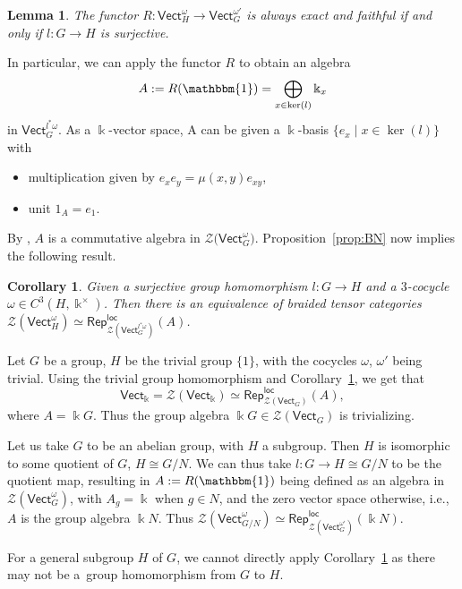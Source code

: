 \documentclass[pdftex]{sigma}
\numberwithin{equation}{section}
\newtheorem{Corollary}[Theorem]{Corollary}
\newtheorem{Lemma}[Theorem]{Lemma}
\newcommand{\locmod}{\mathsf{Rep}^{\mathsf{loc}}}
\newcommand{\Vect}{\mathsf{Vect}}
\newcommand{\cZ}{\mathcal{Z}}
\begin{document}
\begin{Lemma}%
The functor $R\colon \Vect_H^{\omega} \to \Vect_G^{\omega'}$ is always exact and faithful if and only if $l\colon G\to H$ is surjective.
\end{Lemma}


In particular, we can apply the functor $R$ to obtain an algebra
\[A:= R(\mathbbm{1}) = \bigoplus\limits_{x \in \ker(l)}\Bbbk_x \] in $\Vect_G^{l^*\omega}$.
As a $\Bbbk$-vector space, A can be given a $\Bbbk$-basis $\{e_x \mid x \in \ker (l)\}$ with
\begin{itemize}\itemsep=0pt
 \item multiplication given by $e_xe_y = \mu(x,y) e_{xy}$,
 \item unit $1_A = e_1$.
\end{itemize}
By \cite[Proposition 6.1]{BN11}, $A$ is a commutative algebra in $\cZ\big(\Vect_G^\omega\big)$.
Proposition~\ref{prop:BN} now implies the following result.

\begin{Corollary}\label{cor:gen-equiv}
Given a surjective group homomorphism $l\colon G\!\to\! H$ and a $3$-cocycle ${\omega\in C^3(H,\Bbbk^\times)}$.
Then there is an equivalence of braided tensor categories $\cZ(\Vect_H^{\omega})\simeq \locmod_{\cZ(\Vect_G^{l^*\omega})}(A)$.
\end{Corollary}

\begin{Example}
Let $G$ be a group, $H$ be the trivial group $\{1\}$, with the cocycles $\omega$, $\omega'$ being trivial. Using the trivial group homomorphism and Corollary~\ref{cor:gen-equiv}, we get that
\[\Vect_\Bbbk=\cZ(\Vect_\Bbbk) \simeq \locmod_{\cZ(\Vect_G)}(A),\]
where $A = \Bbbk G$. Thus the group algebra $\Bbbk G \in \cZ(\Vect_G)$ is trivializing.
\end{Example}

\begin{Example}
Let us take $G$ to be an abelian group, with $H$ a subgroup. Then $H$ is isomorphic to some quotient of $G$, $H \cong G/N$. We can thus take $l \colon G \to H \cong G/N$ to be the quotient map, resulting in $A:= R(\mathbbm{1})$ being defined as an algebra in $\cZ(\Vect_G^{\omega})$, with $A_g =\Bbbk$ when $g \in N$, and the zero vector space otherwise, i.e., $A$ is the group algebra $\Bbbk N$. Thus ${\cZ(\Vect^\omega_{G/N}) \simeq \locmod_{\cZ(\Vect_G^{\omega'})}(\Bbbk N)}$.
\end{Example}


For a general subgroup $H$ of $G$, we cannot directly apply Corollary~\ref{cor:gen-equiv} as there may not be a~group homomorphism from $G$ to $H$.
\end{document}
